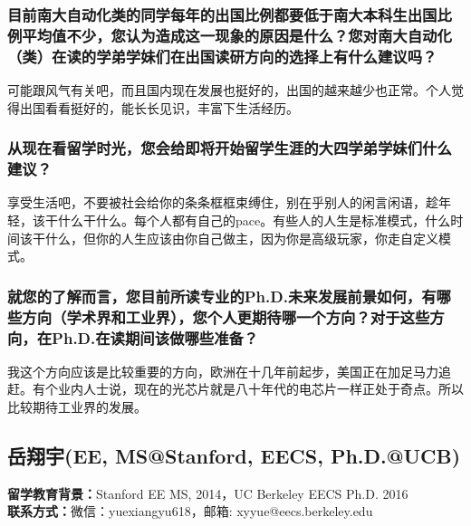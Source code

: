 \documentclass[a4paper,UTF8]{book}
\begin{document}
    \subsubsection*{目前南大自动化类的同学每年的出国比例都要低于南大本科生出国比例平均值不少，您认为造成这一现象的原因是什么？您对南大自动化（类）在读的学弟学妹们在出国读研方向的选择上有什么建议吗？}
    可能跟风气有关吧，而且国内现在发展也挺好的，出国的越来越少也正常。个人觉得出国看看挺好的，能长长见识，丰富下生活经历。
    
    \subsubsection*{从现在看留学时光，您会给即将开始留学生涯的大四学弟学妹们什么建议？}
    享受生活吧，不要被社会给你的条条框框束缚住，别在乎别人的闲言闲语，趁年轻，该干什么干什么。每个人都有自己的pace。有些人的人生是标准模式，什么时间该干什么，但你的人生应该由你自己做主，因为你是高级玩家，你走自定义模式。
    
    \subsubsection*{就您的了解而言，您目前所读专业的Ph.D.未来发展前景如何，有哪些方向（学术界和工业界），您个人更期待哪一个方向？对于这些方向，在Ph.D.在读期间该做哪些准备？}
    我这个方向应该是比较重要的方向，欧洲在十几年前起步，美国正在加足马力追赶。有个业内人士说，现在的光芯片就是八十年代的电芯片一样正处于奇点。所以比较期待工业界的发展。


\clearpage
\subsection{岳翔宇(EE, MS@Stanford, EECS, Ph.D.@UCB)}
    \textbf{留学教育背景：}Stanford EE MS, 2014，UC Berkeley EECS Ph.D. 2016\\
    \textbf{联系方式：}微信：yuexiangyu618，邮箱: xyyue@eecs.berkeley.edu
\end{document}
